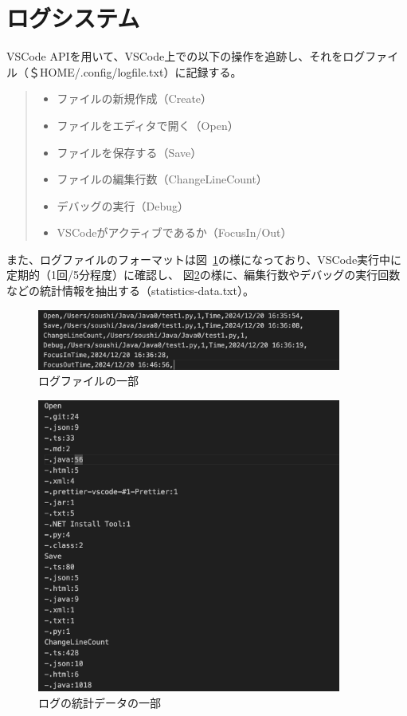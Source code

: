 \documentclass[12pt,twoside]{jbook}
\begin{document}
\section{ログシステム}
 VSCode APIを用いて、VSCode上での以下の操作を追跡し、それをログファイル（＄HOME/.config/logfile.txt）に記録する。
\begin{quote}
  \begin{itemize}
   \item ファイルの新規作成（Create）
   \item ファイルをエディタで開く（Open）
   \item ファイルを保存する（Save）
   \item ファイルの編集行数（ChangeLineCount）
   \item デバッグの実行（Debug）
   \item VSCodeがアクティブであるか（FocusIn/Out）
  \end{itemize}
\end{quote}

 また、ログファイルのフォーマットは図~\ref{fig:aileLog}の様になっており、VSCode実行中に定期的（1回/5分程度）に確認し、
図\ref{fig:statistics}の様に、編集行数やデバッグの実行回数などの統計情報を抽出する（statistics-data.txt）。

\begin{figure}[tb]
  \centering
  \includegraphics[width=10cm]{images/aileLog}
  \caption{ログファイルの一部}
  \label{fig:aileLog}
\end{figure}

\begin{figure}[tb]
  \centering
  \includegraphics[width=10cm]{images/statistics}
  \caption{ログの統計データの一部}
  \label{fig:statistics}
\end{figure}
\end{document}
